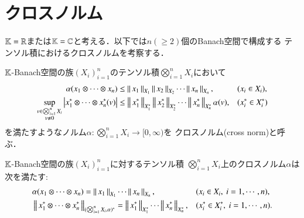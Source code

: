 \section{クロスノルム}
	$\mathbb{K} = \mathbb{R}$または$\mathbb{K}=\mathbb{C}$と考える．以下では$n (\geq 2)$個のBanach空間で構成する
	テンソル積におけるクロスノルムを考察する．
	\begin{screen}
		\begin{dfn}[クロスノルム]\label{def:cross_norm}
			$\mathbb{K}$-Banach空間の族$(X_i)_{i=1}^n$のテンソル積$\bigotimes_{i=1}^n X_i$において
			\begin{align}
				\alpha(x_1 \otimes \cdots \otimes x_n) &\leq \left\|\, x_1\, \right\|_{X_1} \left\|\, x_2\, \right\|_{X_2} \cdots \left\|\, x_n\, \right\|_{X_n}, && (x_i \in X_i), \label{eq:cross_norm_def_1}\\
				\operatorname*{sup}_{\substack{v \in \bigotimes_{i=1}^n X_i \\ v \neq 0}} \left| x_1^* \otimes \cdots \otimes x_n^* (v) \right| &\leq \left\|\, x_1^*\, \right\|_{X_1^*} \left\|\, x_2^*\, \right\|_{X_2^*} \cdots \left\|\, x_n^*\, \right\|_{X_n^*}\alpha(v),
				&& (x_i^* \in X_i^*) \label{eq:cross_norm_def_2}
			\end{align}
			を満たすようなノルム$\alpha:\bigotimes_{i=1}^n X_i \longrightarrow [0,\infty)$を
			クロスノルム(cross norm)と呼ぶ．
		\end{dfn}
	\end{screen}
	
	\begin{screen}
		\begin{thm}
			$\mathbb{K}$-Banach空間の族$(X_i)_{i=1}^{n}$に対するテンソル積
			$\bigotimes_{i=1}^n X_i$上のクロスノルム$\alpha$は
			次を満たす:
			\begin{align}
				&\alpha(x_1 \otimes \cdots \otimes x_n) 
					= \left\|\, x_1\, \right\|_{X_1} \cdots \left\|\, x_n\, \right\|_{X_n}, && (x_i \in X_i,\ i=1,\cdots,n), \\
				&\left\|\, x_1^* \otimes \cdots \otimes x_n^*\, \right\|_{(\bigotimes_{i=1}^n X_i, \alpha)^*} 
					= \left\|\, x_1^*\, \right\|_{X_1^*} \cdots \left\|\, x_n^*\, \right\|_{X_n^*},
				&& (x_i^* \in X_i^*,\ i=1,\cdots,n).
			\end{align}
		\end{thm}
	\end{screen}
	
